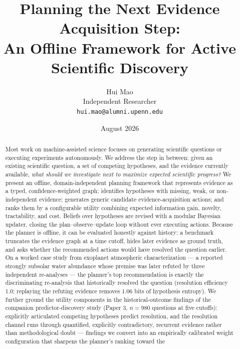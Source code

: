 \documentclass[11pt]{article}
\title{Planning the Next Evidence Acquisition Step:\\
An Offline Framework for Active Scientific Discovery}
\author{Hui Mao \\
\normalsize Independent Researcher \\
\normalsize \texttt{hui.mao@alumni.upenn.edu}}
\date{August 2026}
\begin{document}
\maketitle
\thispagestyle{empty}
\renewcommand{\thefootnote}{\fnsymbol{footnote}}
\renewcommand{\thefootnote}{\arabic{footnote}}

\begin{abstract}
Most work on machine-assisted science focuses on generating scientific
questions or executing experiments autonomously. We address the step in
between: given an existing scientific question, a set of competing
hypotheses, and the evidence currently available, \emph{what should we
investigate next to maximize expected scientific progress?} We present an
offline, domain-independent planning framework that represents evidence as
a typed, confidence-weighted graph; identifies hypotheses with missing,
weak, or non-independent evidence; generates generic candidate
evidence-acquisition actions; and ranks them by a configurable utility
combining expected information gain, novelty, tractability, and cost.
Beliefs over hypotheses are revised with a modular Bayesian updater,
closing the plan--observe--update loop without ever executing actions.
Because the planner is offline, it can be evaluated honestly against
history: a benchmark truncates the evidence graph at a time cutoff, hides
later evidence as ground truth, and asks whether the recommended actions
would have resolved the question earlier. On a worked case study from
exoplanet atmospheric characterization --- a reported strongly subsolar
water abundance whose premise was later refuted by three independent
re-analyses --- the planner's top recommendation is exactly the
discriminating re-analysis that historically resolved the question
(resolution efficiency $1.0$; replaying the refuting evidence removes
$1.06$ bits of hypothesis entropy). We further ground the utility
components in the historical-outcome findings of the companion
predictor-discovery study (Paper 3, $n{=}980$ questions at five
cutoffs): explicitly articulated competing hypotheses predict
resolution, and the resolution channel runs through quantified,
explicitly contradictory, recurrent evidence rather than methodological
doubt --- findings we convert into an empirically calibrated weight
configuration that sharpens the planner's ranking toward the

\end{abstract}
\end{document}
